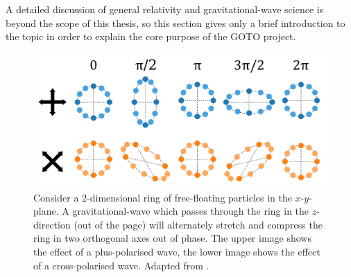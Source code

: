 \begin{colsection}
A detailed discussion of general relativity and gravitational-wave science is beyond the scope of this thesis, so this section gives only a brief introduction to the topic in order to explain the core purpose of the GOTO project.

\begin{figure}[t]
    \begin{center}
        \includegraphics[width=0.8\linewidth]{images/waveimg2.pdf}
    \end{center}
    \caption[Gravitational-wave polarisations]{
        Consider a 2-dimensional ring of free-floating particles in the $x$-$y$-plane. A gravitational-wave which passes through the ring in the $z$-direction (out of the page) will alternately stretch and compress the ring in two orthogonal axes out of phase. The upper image shows the effect of a plus-polarised wave, the lower image shows the effect of a cross-polarised wave. Adapted from \citet{BIGaustralia}.
        }\label{fig:wave}
\end{figure}

\newpage

\end{colsection}


